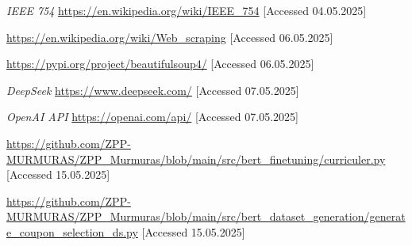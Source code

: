 \documentclass[licencjacka,en]{pracamgr}
\begin{document}
\begin{thebibliography}{199}
\textit{IEEE 754}
\url{https://en.wikipedia.org/wiki/IEEE_754}
[Accessed 04.05.2025]

\url{https://en.wikipedia.org/wiki/Web_scraping}
[Accessed 06.05.2025]

\url{https://pypi.org/project/beautifulsoup4/}
[Accessed 06.05.2025]

\textit{DeepSeek}
\url{https://www.deepseek.com/}
[Accessed 07.05.2025]

\textit{OpenAI API}
\url{https://openai.com/api/}
[Accessed 07.05.2025]

\url{https://github.com/ZPP-MURMURAS/ZPP_Murmuras/blob/main/src/bert_finetuning/curriculer.py}
[Accessed 15.05.2025]

\url{https://github.com/ZPP-MURMURAS/ZPP_Murmuras/blob/main/src/bert_dataset_generation/generate_coupon_selection_ds.py}
[Accessed 15.05.2025]

\end{thebibliography}
\end{document}
